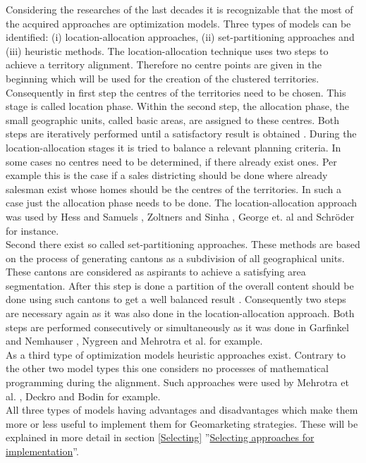 Considering the researches of the last decades it is recognizable that the most of the acquired approaches are optimization models. Three types of models can be identified: (i) location-allocation approaches, (ii) set-partitioning approaches and (iii) heuristic methods. The location-allocation technique uses two steps to achieve a territory alignment. Therefore no centre points are given in the beginning which will be used for the creation of the clustered territories. Consequently in first step the centres of the territories need to be chosen. This stage is called location phase. Within the second step, the allocation phase, the small geographic units, called basic areas, are assigned to these centres. Both steps are iteratively performed until a satisfactory result is obtained \cite{kalcsics}. During the location-allocation stages it is tried to balance a relevant planning criteria. In some cases no centres need to be determined, if there already exist ones. Per example this is the case if a sales districting should be done where already salesman exist whose homes should be the centres of the territories. In such a case just the allocation phase needs to be done. The location-allocation approach was used by Hess and Samuels \cite{hessstuart}, Zoltners and Sinha \cite{zoltner}, George et. al \cite{george} and Schröder \cite{schroeder} for instance.\\
Second there exist so called set-partitioning approaches. These methods are based on the process of generating cantons as a subdivision of all geographical units. These cantons are considered as aspirants to achieve a satisfying area segmentation. After this step is done a partition of the overall content should be done using such cantons to get a well balanced result \cite{schroeder}. Consequently two steps are necessary again as it was also done in the location-allocation approach. Both steps are performed consecutively or simultaneously as it was done in Garfinkel and Nemhauser \cite{garfinkel}, Nygreen \cite{nygreen} and Mehrotra et al. \cite{mehrotra} for example. \\
As a third type of optimization models heuristic approaches exist. Contrary to the other two model types this one considers no processes of mathematical programming during the alignment. Such approaches were used by Mehrotra et al. \cite{mehrotra}, Deckro \cite{deckro} and Bodin \cite{bodin} for example.\\
All three types of models having advantages and disadvantages which make them more or less useful to implement them for Geomarketing strategies. These will be explained in more detail in section \ref{Selecting} ''\hyperref[Selecting]{Selecting approaches for implementation}''.


